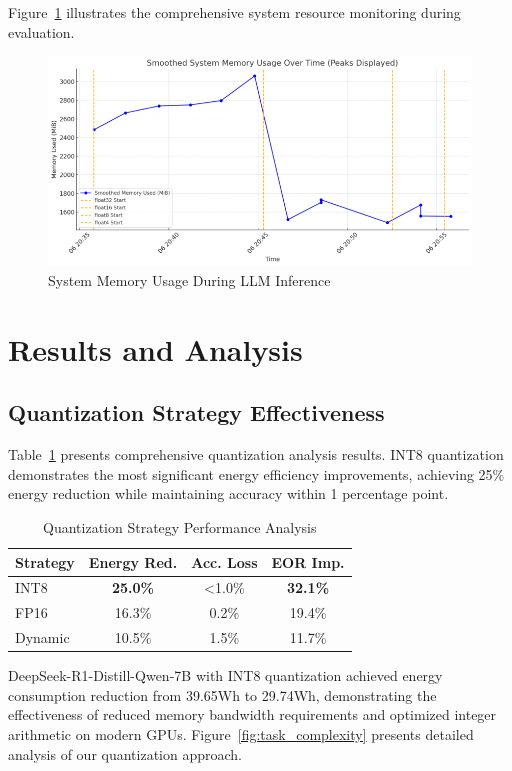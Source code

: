 \documentclass[sigconf,review]{acmart}
\begin{document}
Figure~\ref{fig:eor_tweor_comparison} illustrates the comprehensive system resource monitoring during evaluation.

\begin{figure}[h]
\centering
\includegraphics[width=0.8\columnwidth]{../final_pr/latex-pr/img/System_Memory_Usage.png}
\caption{System Memory Usage During LLM Inference}
\label{fig:eor_tweor_comparison}
\end{figure}

\section{Results and Analysis}

\subsection{Quantization Strategy Effectiveness}

Table~\ref{tab:quantization} presents comprehensive quantization analysis results. INT8 quantization demonstrates the most significant energy efficiency improvements, achieving 25\% energy reduction while maintaining accuracy within 1 percentage point. 

\begin{table}[h]
\centering
\caption{Quantization Strategy Performance Analysis}
\label{tab:quantization}
\footnotesize
\begin{tabular}{@{}lccc@{}}
\toprule
\textbf{Strategy} & \textbf{Energy Red.} & \textbf{Acc. Loss} & \textbf{EOR Imp.} \\
\midrule
INT8 & \textbf{25.0\%} & <1.0\% & \textbf{32.1\%} \\
FP16 & 16.3\% & 0.2\% & 19.4\% \\
Dynamic & 10.5\% & 1.5\% & 11.7\% \\
\bottomrule
\end{tabular}
\end{table}

DeepSeek-R1-Distill-Qwen-7B with INT8 quantization achieved energy consumption reduction from 39.65Wh to 29.74Wh, demonstrating the effectiveness of reduced memory bandwidth requirements and optimized integer arithmetic on modern GPUs. Figure~\ref{fig:task_complexity} presents detailed analysis of our quantization approach.
\end{document}
